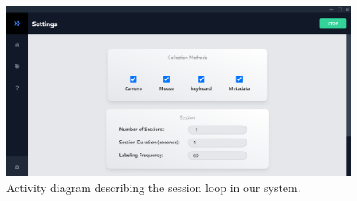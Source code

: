 \documentclass[../main.tex]{subfiles}
\begin{document}
\begin{figure}[htp]
    \centering
    \includegraphics[width=14cm]{figures/ui_settings}   
    \caption{Activity diagram describing the session loop in our system.}
    \label{fig:ui_settings} 
\end{figure}
\end{document}
